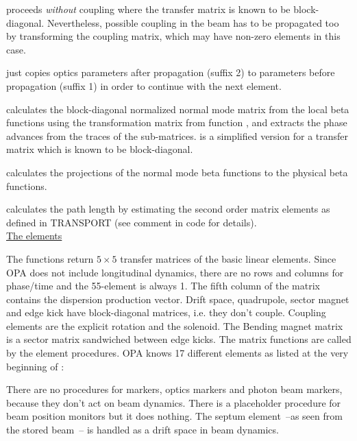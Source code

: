 \documentclass[12pt]{article}
\newcommand\code[1]{{\tt #1}}
\newcommand{\unico}[1]{{\color{burntorange}\code{#1}}}
\newcommand{\opauni}[1]{\colorbox{orange!30}{{\color{black}\code{#1}}}}
\newcommand{\ouni}[1]{\hyperref[#1]{\opauni{#1}}}
\begin{document}
\unico{MBD\_prop} proceeds {\em without} coupling where the transfer matrix is known to be block-diagonal. Nevertheless, possible coupling in the beam has to be propagated too by transforming the coupling matrix, which may have non-zero elements in this case. 

\unico{PropForward} just copies optics parameters after propagation (suffix 2) to parameters before propagation (suffix 1) in order to continue with the next element.

\unico{PhaseAdvance} calculates the block-diagonal normalized normal mode matrix from the local beta functions using the transformation matrix from function \unico{CirMat}, and extracts the phase advances from the traces of the sub-matrices. \unico{getdTune} is a simplified version for a transfer matrix which is known to be block-diagonal.

\unico{GetBeta12} calculates the projections of the normal mode beta functions to the physical beta functions.

\unico{Pathlength} calculates the path length by estimating the second order matrix elements as defined in TRANSPORT (see comment in code for details).\\

\underline{The elements}

The \unico{\dots\_Matrix} functions return $5\times 5$ transfer matrices of the basic linear elements. Since OPA does not include longitudinal dynamics, there are no rows and columns for phase/time and the 55-element is always 1. The fifth column of the matrix contains the dispersion production vector. Drift space, quadrupole, sector magnet and edge kick have block-diagonal matrices, i.e. they don't couple. Coupling elements are the explicit rotation and the solenoid. The Bending magnet matrix is a sector matrix sandwiched between edge kicks. The matrix functions are called by the element procedures. 
OPA knows 17 different elements as listed at the very beginning of \ouni{globlib}:

There are no procedures for markers, optics markers and photon beam markers, because they don't act on beam dynamics. There is a placeholder procedure \unico{Monitor} for beam position monitors but it does nothing. The septum element~--as seen from the stored beam~-- is handled as a drift space in beam dynamics.
\end{document}

